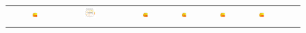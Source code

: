 \documentclass[a4paper,11pt,twoside,openright]{book}							%
\begin{document}
\begin{landscape}
\begin{figure}
\begin{tabular}{lcccccccc}
\parbox[t]{2mm}{}&
\includegraphics[trim=0cm 0cm 0cm 1.8cm,clip=true,width=0.19\textwidth,valign=t]{Immagini/simulazioni/REALEtempo2.png}&
\includegraphics[trim=0.8cm 0.8cm 2.5cm 1.2cm,clip=true,width=0.19\textwidth,valign=t]{Immagini/simulazioni/Dati_tempo2.png}&
\includegraphics[trim=0cm 0cm 0cm 1.8cm,clip=true,width=0.19\textwidth,valign=t]{Immagini/simulazioni/KRIGtempo2.png}&
\includegraphics[trim=0cm 0cm 0cm 1.8cm,clip=true,width=0.19\textwidth,valign=t]{Immagini/simulazioni/TPStempo2.png}&
\includegraphics[trim=0cm 0cm 0cm 1.8cm,clip=true,width=0.19\textwidth,valign=t]{Immagini/simulazioni/SOAPtempo2.png}&
\includegraphics[trim=0cm 0cm 0cm 1.8cm,clip=true,width=0.19\textwidth,valign=t]{Immagini/simulazioni/STSRtempo2.png}\\
\parbox[t]{2mm}{}&

\end{tabular}
\end{figure}
\end{landscape}
\end{document}
